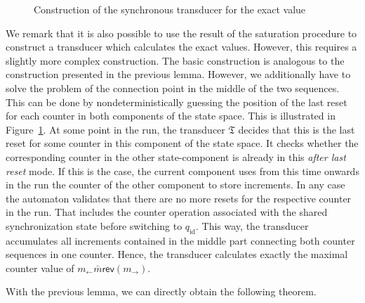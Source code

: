 \documentclass{LMCS}
\newcommand{\eps}{\varepsilon}
\newcommand{\automatonT}{\mathfrak T}
\newcommand{\rl}{m_{\leftarrow}}
\newcommand{\rr}{m_{\rightarrow}}
\newcommand{\rev}{\mathsf{rev}}
\begin{document}
\begin{figure}[t]
\begin{center}
   \end{center}
  \caption{Construction of the synchronous transducer for the exact value}
  \label{fig:r1Rr2ReverseRecognitionExact}
\end{figure}

We remark that it is also possible to use the result of the saturation procedure to construct a transducer which calculates the exact values. However, this requires a slightly more complex construction. The basic construction is analogous to the construction presented in the previous lemma. However, we additionally have to solve the problem of the connection point in the middle of the two sequences. This can be done by nondeterministically guessing the position of the last reset for each counter in both components of the state space. This is illustrated in Figure~\ref{fig:r1Rr2ReverseRecognitionExact}. At some point in the run, the transducer $\automatonT$ decides that this is the last reset for some counter in this component of the state space. It checks whether the corresponding counter in the other state-component is already in this \emph{after last reset} mode. If this is the case, the current component uses from this time onwards in the run the counter of the other component to store increments. In any case the automaton validates that there are no more resets for the respective counter in the run. That includes the counter operation associated with the shared synchronization state before switching to $q_{\mathrm{id}}$. This way, the transducer accumulates all increments contained in the middle part connecting both counter sequences in one counter. Hence, the transducer calculates exactly the maximal counter value of $\rl \bar m \rev(\rr)$. 

With the previous lemma, we can directly obtain the following theorem.
\end{document}
